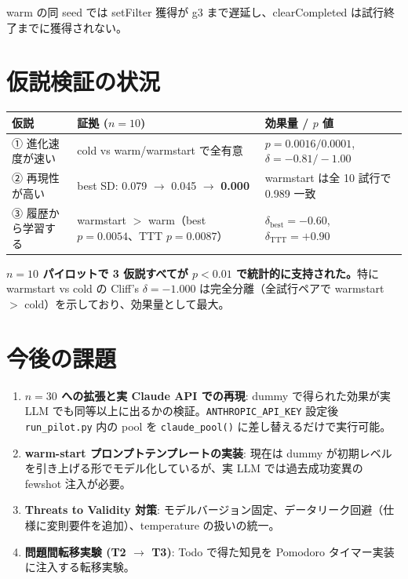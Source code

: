 \documentclass[a4paper,11pt]{ltjsarticle}
\begin{document}
warm の同 seed では setFilter 獲得が g3 まで遅延し、clearCompleted は試行終了までに獲得されない。

\section{仮説検証の状況}

\begin{center}
\begin{tabular}{@{}lll@{}}
\toprule
仮説 & 証拠 ($n=10$) & 効果量 / $p$ 値 \\
\midrule
① 進化速度が速い & cold vs warm/warmstart で全有意 & $p = 0.0016 / 0.0001$, $\delta = -0.81 / -1.00$ \\
② 再現性が高い & best SD: 0.079 $\to$ 0.045 $\to$ \textbf{0.000} & warmstart は全 10 試行で 0.989 一致 \\
③ 履歴から学習する & warmstart $>$ warm（best $p=0.0054$、TTT $p=0.0087$）& $\delta_{\text{best}}=-0.60$, $\delta_{\text{TTT}}=+0.90$ \\
\bottomrule
\end{tabular}
\end{center}

\textbf{$n=10$ パイロットで 3 仮説すべてが $p < 0.01$ で統計的に支持された。}特に warmstart vs cold の Cliff's $\delta = -1.000$ は完全分離（全試行ペアで warmstart $>$ cold）を示しており、効果量として最大。

\section{今後の課題}

\begin{enumerate}[leftmargin=2em,itemsep=2pt]
  \item \textbf{$n=30$ への拡張と実 Claude API での再現}: dummy で得られた効果が実 LLM でも同等以上に出るかの検証。\texttt{ANTHROPIC\_API\_KEY} 設定後 \texttt{run\_pilot.py} 内の pool を \texttt{claude\_pool()} に差し替えるだけで実行可能。
  \item \textbf{warm-start プロンプトテンプレートの実装}: 現在は dummy が初期レベルを引き上げる形でモデル化しているが、実 LLM では過去成功変異の fewshot 注入が必要。
  \item \textbf{Threats to Validity 対策}: モデルバージョン固定、データリーク回避（仕様に変則要件を追加）、temperature の扱いの統一。
  \item \textbf{問題間転移実験 (T2 $\to$ T3)}: Todo で得た知見を Pomodoro タイマー実装に注入する転移実験。
\end{enumerate}
\end{document}

